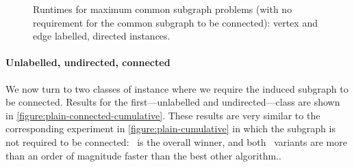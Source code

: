 \begin{figure}[h!]
    \centering
    \par\bigskip
    \caption{Runtimes for maximum
    common subgraph problems (with no requirement for the common subgraph
    to be connected): vertex and edge labelled, directed instances.}\label{figure:mcs-cumulative-labelled-not-connected}
\end{figure}









\paragraph{Unlabelled, undirected, connected}
We now turn to two classes of instance where we require the induced
subgraph to be connected.
Results for the first---unlabelled and undirected---class are shown
in \cref{figure:plain-connected-cumulative}.  These results are very similar to
the corresponding experiment in \cref{figure:plain-cumulative} in which the
subgraph is not required to be connected: \McSplitDown\ is the overall winner,
and both \McSplit\ variants are more than an order of magnitude faster than
the best other algorithm..

